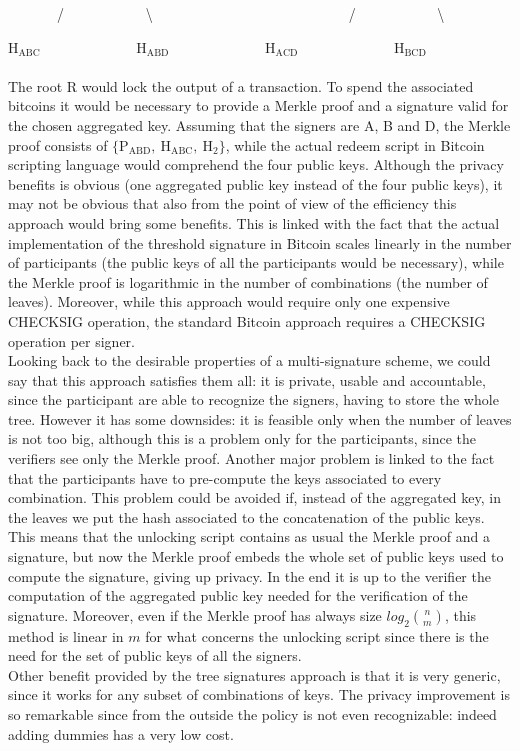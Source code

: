 \ \ \ \ \ \ \ / \ \ \ \ \ \ \ \ \ \ \ \textbackslash \ \ \ \ \ \ \ \ \ \ \ \ \ \ \ \ \ \ \ \ \ \ \ \ \ \ \ \ / \ \ \ \ \ \ \ \ \ \ \ \textbackslash

H$_\text{ABC}$ \ \ \ \ \ \ \ \ \ \ \ \ \ H$_\text{ABD}$ \ \ \ \ \ \ \ \ \ \ \ \ \ H$_\text{ACD}$ \ \ \ \ \ \ \ \ \ \ \ \ \ H$_\text{BCD}$
\\
\\
The root R would lock the output of a transaction. To spend the associated bitcoins it would be necessary to provide a Merkle proof and a signature valid for the chosen aggregated key. Assuming that the signers are A, B and D, the Merkle proof consists of $\{\text{P}_\text{ABD}, \ \text{H}_\text{ABC}, \ \text{H}_2\}$, while the actual redeem script in Bitcoin scripting language would comprehend the four public keys. Although the privacy benefits is obvious (one aggregated public key instead of the four public keys), it may not be obvious that also from the point of view of the efficiency this approach would bring some benefits. This is linked with the fact that the actual implementation of the threshold signature in Bitcoin scales linearly in the number of participants (the public keys of all the participants would be necessary), while the Merkle proof is logarithmic in the number of combinations (the number of leaves). Moreover, while this approach would require only one expensive CHECKSIG operation, the standard Bitcoin approach requires a CHECKSIG operation per signer.
\\
Looking back to the desirable properties of a multi-signature scheme, we could say that this approach satisfies them all: it is private, usable and accountable, since the participant are able to recognize the signers, having to store the whole tree. However it has some downsides: it is feasible only when the number of leaves is not too big, although this is a problem only for the participants, since the verifiers see only the Merkle proof. Another major problem is linked to the fact that the participants have to pre-compute the keys associated to every combination. This problem could be avoided if, instead of the aggregated key, in the leaves we put the hash associated to the concatenation of the public keys. This means that the unlocking script contains as usual the Merkle proof and a signature, but now the Merkle proof embeds the whole set of public keys used to compute the signature, giving up privacy. In the end it is up to the verifier the computation of the aggregated public key needed for the verification of the signature. Moreover, even if the Merkle proof has always size $log_2$$n\choose m$, this method is linear in $m$ for what concerns the unlocking script since there is the need for the set of public keys of all the signers.
\\
Other benefit provided by the tree signatures approach is that it is very generic, since it works for any subset of combinations of keys. The privacy improvement is so remarkable since from the outside the policy is not even recognizable: indeed adding dummies has a very low cost.

